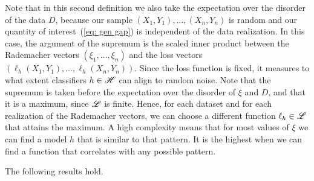 \documentclass[reqno]{amsart}
\begin{document}
Note that in this second definition we also take the expectation over the disorder of the data $D$, because our sample $(X_1,Y_1),\ldots,(X_n,Y_n)$ is random and our quantity of interest~(\ref{eq: gen gap}) is independent of the data realization. 
In this case, the argument of the supremum is the scaled inner product between the Rademacher vectors $(\xi_1,\ldots,\xi_n)$ and the loss vectors $(\ell_h(X_1,Y_1),\ldots,\ell_h(X_n,Y_n))$. Since the loss function is fixed, it measures to what extent classifiers $h\in\mathscr{H}$ can align to random noise. Note that the supremum is taken before the expectation over the disorder of $\xi$ and $D$, and that it is a maximum, since $\mathscr{L}$ is finite. Hence, for each dataset and for each realization of the Rademacher vectors, we can choose a different function $\ell_h \in\mathscr{L}$ that attains the maximum. A high complexity means that for most values of $\xi$ we can find a model $h$ that is similar to that pattern. It is the highest when we can find a function that correlates with any possible pattern.

The following results hold. 
\end{document}
